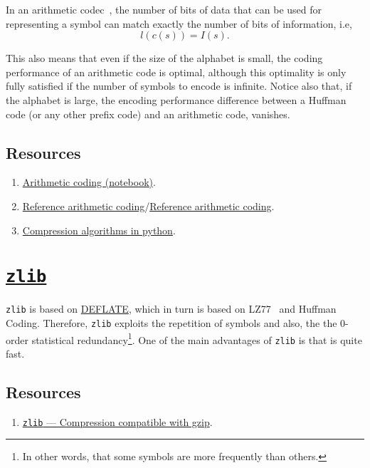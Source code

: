In an arithmetic codec~\cite{vruiz__arithmetic_coding}, the number of
bits of data that can be used for representing a symbol can match
exactly the number of bits of information, i.e,
\begin{equation}
  l(c(s)) = I(s).
\end{equation}

This also means that even if the size of the alphabet is small, the
coding performance of an arithmetic code is optimal, although this
optimality is only fully satisfied if the number of symbols to encode
is infinite. Notice also that, if the alphabet is large, the encoding
performance difference between a Huffman code (or any other prefix
code) and an arithmetic code, vanishes.

\subsection*{Resources}
\begin{enumerate}
\item \href{https://github.com/vicente-gonzalez-ruiz/arithmetic_coding}{Arithmetic coding (notebook)}.
\item \href{https://www.nayuki.io/page/reference-arithmetic-coding}{Reference arithmetic coding}/\href{https://github.com/nayuki/Reference-arithmetic-coding}{Reference arithmetic coding}.
\item \href{https://www.inference.org.uk/mackay/python/compress/#AC}{Compression algorithms in python}.
\end{enumerate}

\section{\href{https://zlib.net/}{\texttt{zlib}}}

\texttt{zlib} is based on
\href{https://en.wikipedia.org/wiki/Deflate}{DEFLATE}, which in turn
is based on LZ77~\cite{vruiz__LZW} and Huffman Coding. Therefore,
\texttt{zlib} exploits the repetition of symbols and also, the the
0-order statistical redundancy\footnote{In other words, that some
  symbols are more frequently than others.}. One of the main advantages
of \texttt{zlib} is that is quite fast.

\subsection*{Resources}
\begin{enumerate}
\item \href{https://docs.python.org/3/library/zlib.html}{\texttt{zlib}
    — Compression compatible with gzip}.
\end{enumerate}

